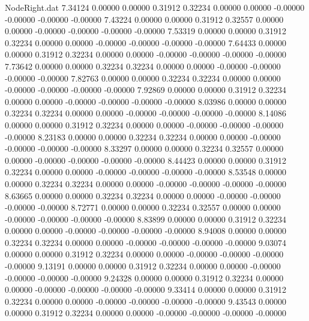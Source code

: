\begin{filecontents}{NodeRight.dat}
   7.34124    0.00000    0.00000     0.31912    0.32234    0.00000    0.00000   -0.00000   -0.00000   -0.00000   -0.00000
   7.43224    0.00000    0.00000     0.31912    0.32557    0.00000    0.00000   -0.00000   -0.00000   -0.00000   -0.00000
   7.53319    0.00000    0.00000     0.31912    0.32234    0.00000    0.00000   -0.00000   -0.00000   -0.00000   -0.00000
   7.64433    0.00000    0.00000     0.31912    0.32234    0.00000    0.00000   -0.00000   -0.00000   -0.00000   -0.00000
   7.73642    0.00000    0.00000     0.32234    0.32234    0.00000    0.00000   -0.00000   -0.00000   -0.00000   -0.00000
   7.82763    0.00000    0.00000     0.32234    0.32234    0.00000    0.00000   -0.00000   -0.00000   -0.00000   -0.00000
   7.92869    0.00000    0.00000     0.31912    0.32234    0.00000    0.00000   -0.00000   -0.00000   -0.00000   -0.00000
   8.03986    0.00000    0.00000     0.32234    0.32234    0.00000    0.00000   -0.00000   -0.00000   -0.00000   -0.00000
   8.14086    0.00000    0.00000     0.31912    0.32234    0.00000    0.00000   -0.00000   -0.00000   -0.00000   -0.00000
   8.23183    0.00000    0.00000     0.32234    0.32234    0.00000    0.00000   -0.00000   -0.00000   -0.00000   -0.00000
   8.33297    0.00000    0.00000     0.32234    0.32557    0.00000    0.00000   -0.00000   -0.00000   -0.00000   -0.00000
   8.44423    0.00000    0.00000     0.31912    0.32234    0.00000    0.00000   -0.00000   -0.00000   -0.00000   -0.00000
   8.53548    0.00000    0.00000     0.32234    0.32234    0.00000    0.00000   -0.00000   -0.00000   -0.00000   -0.00000
   8.63665    0.00000    0.00000     0.32234    0.32234    0.00000    0.00000   -0.00000   -0.00000   -0.00000   -0.00000
   8.72771    0.00000    0.00000     0.32234    0.32557    0.00000    0.00000   -0.00000   -0.00000   -0.00000   -0.00000
   8.83899    0.00000    0.00000     0.31912    0.32234    0.00000    0.00000   -0.00000   -0.00000   -0.00000   -0.00000
   8.94008    0.00000    0.00000     0.32234    0.32234    0.00000    0.00000   -0.00000   -0.00000   -0.00000   -0.00000
   9.03074    0.00000    0.00000     0.31912    0.32234    0.00000    0.00000   -0.00000   -0.00000   -0.00000   -0.00000
   9.13191    0.00000    0.00000     0.31912    0.32234    0.00000    0.00000   -0.00000   -0.00000   -0.00000   -0.00000
   9.24328    0.00000    0.00000     0.31912    0.32234    0.00000    0.00000   -0.00000   -0.00000   -0.00000   -0.00000
   9.33414    0.00000    0.00000     0.31912    0.32234    0.00000    0.00000   -0.00000   -0.00000   -0.00000   -0.00000
   9.43543    0.00000    0.00000     0.31912    0.32234    0.00000    0.00000   -0.00000   -0.00000   -0.00000   -0.00000

\end{filecontents}
